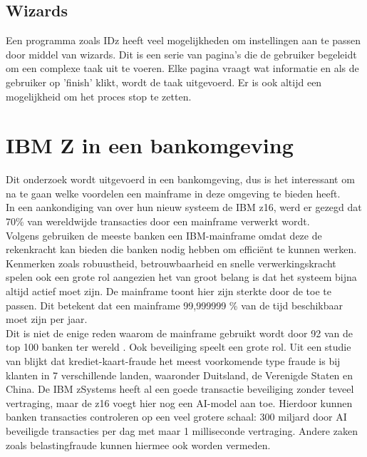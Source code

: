 \subsection{Wizards}
Een programma zoals IDz heeft veel mogelijkheden om instellingen aan te passen door middel van wizards. Dit is een serie van pagina's die de gebruiker begeleidt om een complexe taak uit te voeren. Elke pagina vraagt wat informatie en als de gebruiker op 'finish' klikt, wordt de taak uitgevoerd. Er is ook altijd een mogelijkheid om het proces stop te zetten. \autocite{Eclipse2006}

\section{IBM Z in een bankomgeving}
Dit onderzoek wordt uitgevoerd in een bankomgeving, dus is het interessant om na te gaan welke voordelen een mainframe in deze omgeving te bieden heeft. \\ 

In een aankondiging van \textcite{IBM2022} over hun nieuw systeem de IBM z16, werd er gezegd dat 70\% van wereldwijde transacties door een mainframe verwerkt wordt. \\

Volgens \textcite{Turner2022} gebruiken de meeste banken een IBM-mainframe omdat deze de rekenkracht kan bieden die banken nodig hebben om efficiënt te kunnen werken. Kenmerken zoals robuustheid, betrouwbaarheid en snelle verwerkingskracht spelen ook een grote rol aangezien het van groot belang is dat het systeem bijna altijd actief moet zijn. De mainframe toont hier zijn sterkte door de  toe te passen. Dit betekent dat een mainframe 99,999999 \% van de tijd beschikbaar moet zijn per jaar. \autocite{IBMa} \\

Dit is niet de enige reden waarom de mainframe gebruikt wordt door 92 van de top 100 banken ter wereld \autocite{Tozzi2022}. Ook beveiliging speelt een grote rol. Uit een studie van \textcite{MorningConsult2022} blijkt dat krediet-kaart-fraude het meest voorkomende type fraude is bij klanten in 7 verschillende landen, waaronder Duitsland, de Verenigde Staten en China. De IBM zSystems heeft al een goede transactie beveiliging zonder teveel vertraging, maar de z16 voegt hier nog een AI-model aan toe. Hierdoor kunnen banken transacties controleren op een veel grotere schaal: 300 miljard door AI beveiligde transacties per dag met maar 1 milliseconde vertraging. Andere zaken zoals belastingfraude kunnen hiermee ook worden vermeden. \autocite{IBM2022} \\

